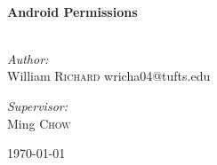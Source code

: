 \begin{titlepage}

\begin{center}


\HRule \\[0.4cm]
{ \huge \bfseries Android Permissions}\\[0.4cm]

\HRule \\[1.5cm]

\begin{minipage}{0.4\textwidth}
\begin{flushleft} \large
\emph{Author:}\\
William \textsc{Richard}
wricha04@tufts.edu
\end{flushleft}
\end{minipage}
\begin{minipage}{0.4\textwidth}
\begin{flushright} \large
\emph{Supervisor:} \\
Ming \textsc{Chow}
\end{flushright}
\end{minipage}

\vfill

{\large \today}

\end{center}

\end{titlepage}